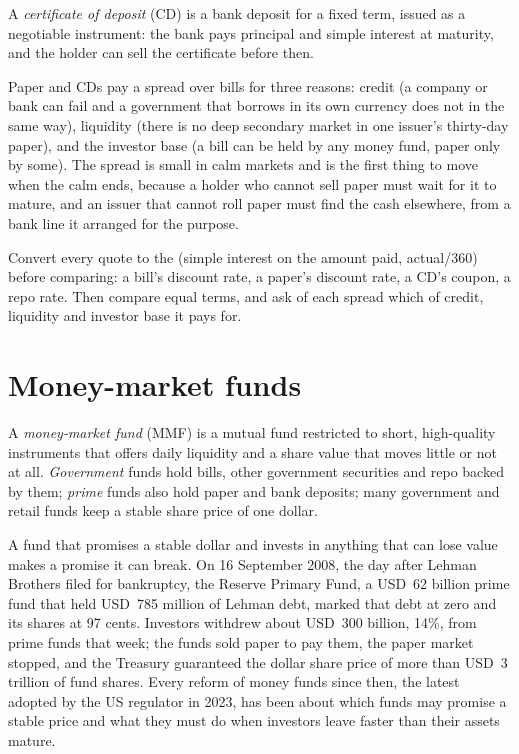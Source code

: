 \begin{definition}\label{def:m2:money-markets:cd}
A \emph{certificate of deposit} (CD) is a bank
deposit for a fixed term, issued as a negotiable instrument: the bank pays
principal and simple interest at maturity, and the holder can sell the
certificate before then.
\end{definition}

Paper and CDs pay a spread over bills for three reasons: credit (a company or
bank can fail and a government that borrows in its own currency does not in
the same way), liquidity (there is no deep secondary market in one issuer's
thirty-day paper), and the investor base (a bill can be held by any money
fund, paper only by some). The spread is small in calm markets and is the
first thing to move when the calm ends, because a holder who cannot sell paper
must wait for it to mature, and an issuer that cannot roll paper must find
the cash elsewhere, from a bank line it arranged for the purpose.

\begin{method}\label{met:m2:money-markets:compare}
Convert every quote to the  (simple interest on the amount
paid, actual/360) before comparing: a bill's discount rate, a paper's
discount rate, a CD's coupon, a repo rate. Then compare equal terms, and ask
of each spread which of credit, liquidity and investor base it pays for.
\end{method}

\section{Money-market funds}

\begin{definition}\label{def:m2:money-markets:mmf}
A \emph{money-market fund} (MMF) is a mutual fund
restricted to short, high-quality instruments that offers daily liquidity and
a share value that moves little or not at all. \emph{Government} funds hold
bills, other government securities and repo backed by them; \emph{prime}
funds also hold paper and bank deposits; many government and retail funds
keep a stable share price of one dollar.
\end{definition}

A fund that promises a stable dollar and invests in anything that can lose
value makes a promise it can break. On 16 September 2008, the day after Lehman
Brothers filed for bankruptcy, the Reserve Primary Fund, a USD~62 billion
prime fund that held USD~785 million of Lehman debt, marked that debt at zero
and its shares at 97 cents. Investors withdrew about USD~300 billion, 14\%,
from prime funds that week; the funds sold paper to pay them, the paper market
stopped, and the Treasury guaranteed the dollar share price of more than USD~3
trillion of fund shares. Every reform of money funds since then, the latest
adopted by the US regulator in 2023, has been about which funds may promise a
stable price and what they must do when investors leave faster than their
assets mature.

